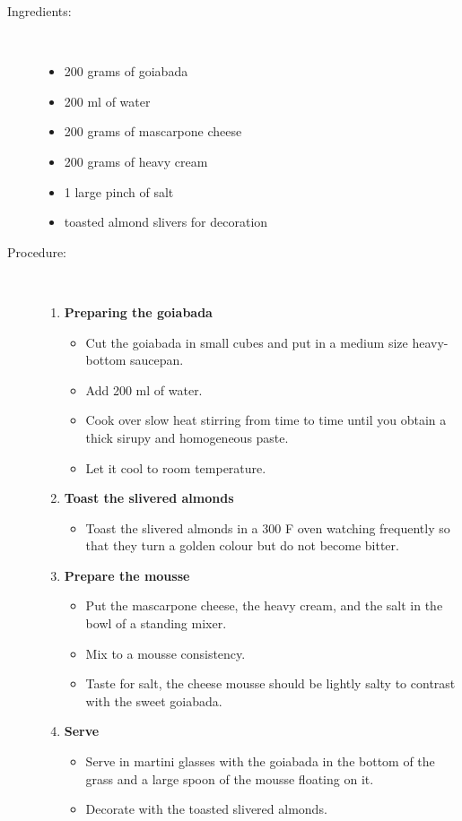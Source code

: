 \documentclass [11pt, letterpaper] {article}
\begin{document}
\begin{description}

\item[Ingredients:]\ \\
	\begin{itemize}
	\item 200 grams of goiabada
	\item 200 ml of water
	\item	200 grams of mascarpone cheese
	\item 200 grams of heavy cream
	\item 1 large pinch of salt
	\item toasted almond slivers for decoration
	\end{itemize}

\item[Procedure:]\ \\

	\begin{enumerate}
	\item {\bf Preparing the goiabada}
	\begin{itemize}
	\item Cut the goiabada in small cubes and put in a medium size heavy-bottom saucepan.
	\item Add 200 ml of water.
	\item Cook over slow heat stirring from time to time until you obtain a thick sirupy and homogeneous paste.
	\item Let it cool to room temperature.
	\end{itemize}
	
	\item {\bf Toast the slivered almonds}
	\begin{itemize}
	\item Toast the slivered almonds in a 300 F oven watching frequently so that they turn a golden colour but do not become bitter.
	\end{itemize}
	
	\item {\bf Prepare the mousse}
	\begin{itemize}
	\item Put the mascarpone cheese, the heavy cream, and the salt in the bowl of a standing mixer.
	\item Mix to a mousse consistency.
	\item Taste for salt, the cheese mousse should be lightly salty to contrast with the sweet goiabada.
	\end{itemize}
	
	\item {\bf Serve}
	\begin{itemize}
	\item Serve in martini glasses with the goiabada in the bottom of the grass and a large spoon of the mousse floating on it.
	\item Decorate with the toasted slivered almonds.
	\end{itemize}

	\end{enumerate}
\end{description}
\end{document}
